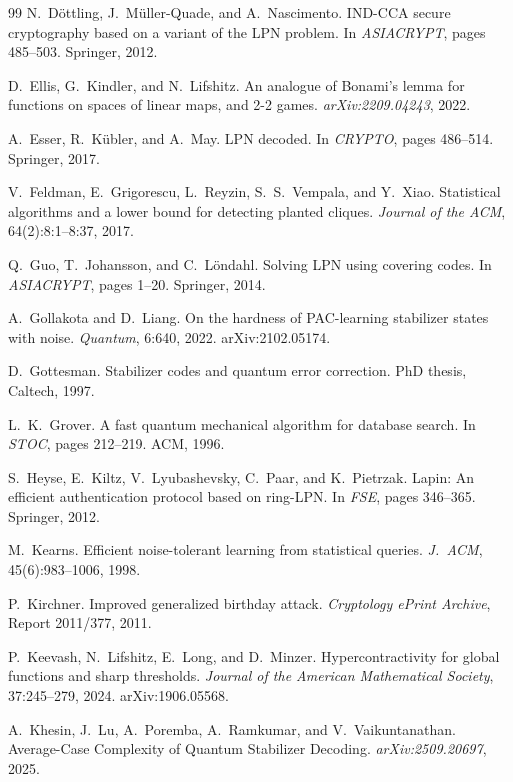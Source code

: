\documentclass[11pt,a4paper]{article}
\theoremstyle{plain}
\theoremstyle{definition}
\begin{document}
\begin{thebibliography}{99}
N.~D\"ottling, J.~M\"uller-Quade, and A.~Nascimento.
IND-CCA secure cryptography based on a variant of the LPN problem.
In \emph{ASIACRYPT}, pages 485--503. Springer, 2012.

D.~Ellis, G.~Kindler, and N.~Lifshitz.
An analogue of Bonami's lemma for functions on spaces of linear maps, and 2-2 games.
\emph{arXiv:2209.04243}, 2022.

A.~Esser, R.~K\"ubler, and A.~May.
LPN decoded.
In \emph{CRYPTO}, pages 486--514. Springer, 2017.

V.~Feldman, E.~Grigorescu, L.~Reyzin, S.~S.~Vempala, and Y.~Xiao.
Statistical algorithms and a lower bound for detecting planted cliques.
\emph{Journal of the ACM}, 64(2):8:1--8:37, 2017.

Q.~Guo, T.~Johansson, and C.~L\"ondahl.
Solving LPN using covering codes.
In \emph{ASIACRYPT}, pages 1--20. Springer, 2014.

A.~Gollakota and D.~Liang.
On the hardness of PAC-learning stabilizer states with noise.
\emph{Quantum}, 6:640, 2022. arXiv:2102.05174.

D.~Gottesman.
Stabilizer codes and quantum error correction.
PhD thesis, Caltech, 1997.

L.~K.~Grover.
A fast quantum mechanical algorithm for database search.
In \emph{STOC}, pages 212--219. ACM, 1996.

S.~Heyse, E.~Kiltz, V.~Lyubashevsky, C.~Paar, and K.~Pietrzak.
Lapin: An efficient authentication protocol based on ring-LPN.
In \emph{FSE}, pages 346--365. Springer, 2012.

M.~Kearns.
Efficient noise-tolerant learning from statistical queries.
\emph{J.\ ACM}, 45(6):983--1006, 1998.

P.~Kirchner.
Improved generalized birthday attack.
\emph{Cryptology ePrint Archive}, Report 2011/377, 2011.

P.~Keevash, N.~Lifshitz, E.~Long, and D.~Minzer.
Hypercontractivity for global functions and sharp thresholds.
\emph{Journal of the American Mathematical Society}, 37:245--279, 2024. arXiv:1906.05568.

A.~Khesin, J.~Lu, A.~Poremba, A.~Ramkumar, and V.~Vaikuntanathan.
Average-Case Complexity of Quantum Stabilizer Decoding.
\emph{arXiv:2509.20697}, 2025.


\end{thebibliography}
\end{document}
